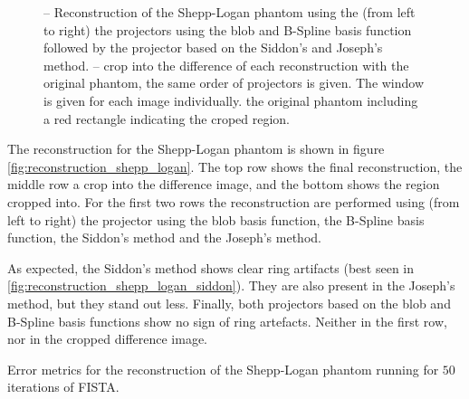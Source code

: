 \begin{figure}[h]

	\caption{--
		Reconstruction of the Shepp-Logan phantom using the (from left to right) the
		projectors using the blob and B-Spline basis function followed by the projector
		based on the Siddon's and Joseph's method.
		--
		crop into the difference of each reconstruction with the original phantom, the same
		order of projectors is given. The window is given for each image individually.
		 the original phantom including a red
		rectangle indicating the croped region.
	}%
	\label{fig:reconstruction_shepp_logan}
\end{figure}

The reconstruction for the Shepp-Logan phantom is shown in figure
\autoref{fig:reconstruction_shepp_logan}. The top row shows the final reconstruction, the middle row
a crop into the difference image, and the bottom shows the region cropped into. For the first two
rows the reconstruction are performed using (from left to right) the projector using the blob basis
function, the B-Spline basis function, the Siddon's method and the Joseph's method.

As expected, the Siddon's method shows clear ring artifacts (best seen in
\autoref{fig:reconstruction_shepp_logan_siddon}). They are also present in the Joseph's method, but
they stand out less. Finally, both projectors based on the blob and B-Spline basis functions show no
sign of ring artefacts. Neither in the first row, nor in the cropped difference image.

\begin{table}[h]%
	\centering
	\caption{Error metrics for the reconstruction of the Shepp-Logan phantom running for \(50\)
		iterations of FISTA.}%
	\label{tab:error_metric_shepp_logan}
\end{table}

